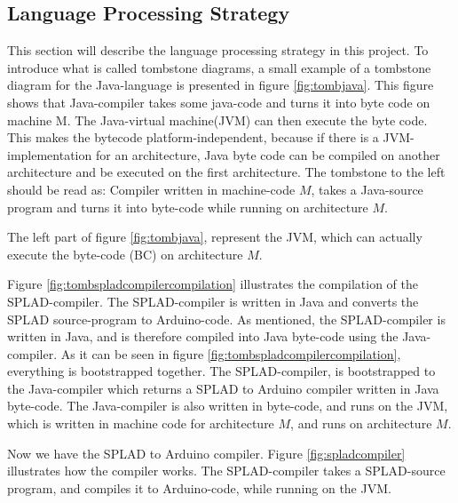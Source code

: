 \subsection{Language Processing Strategy}
This section will describe the language processing strategy in this project. To introduce what is called tombstone diagrams, a small example of a tombstone diagram for the Java-language is presented in figure \ref{fig:tombjava}. This figure shows that Java-compiler takes some java-code and turns it into byte code on machine M. The Java-virtual machine(JVM) can then execute the byte code. This makes the bytecode platform-independent, because if there is a JVM-implementation for an architecture, Java byte code can be compiled on another architecture and be executed on the first architecture. The tombstone to the left should be read as: Compiler written in machine-code $M$, takes a Java-source program and turns it into byte-code while running on architecture $M$.


The left part of figure \ref{fig:tombjava}, represent the JVM, which can actually execute the byte-code (BC) on architecture $M$.

Figure \ref{fig:tombspladcompilercompilation} illustrates the compilation of the SPLAD-compiler. The SPLAD-compiler is written in Java and converts the SPLAD source-program to Arduino-code. As mentioned, the SPLAD-compiler is written in Java, and is therefore compiled into Java byte-code using the Java-compiler. As it can be seen in figure \ref{fig:tombspladcompilercompilation}, everything is bootstrapped together. The SPLAD-compiler, is bootstrapped to the Java-compiler which returns a SPLAD to Arduino compiler written in Java byte-code. The Java-compiler is also written in byte-code, and runs on the JVM, which is written in machine code for architecture $M$, and runs on architecture $M$.

Now we have the SPLAD to Arduino compiler. Figure \ref{fig:spladcompiler} illustrates how the compiler works. The SPLAD-compiler takes a SPLAD-source program, and compiles it to Arduino-code, while running on the JVM.
